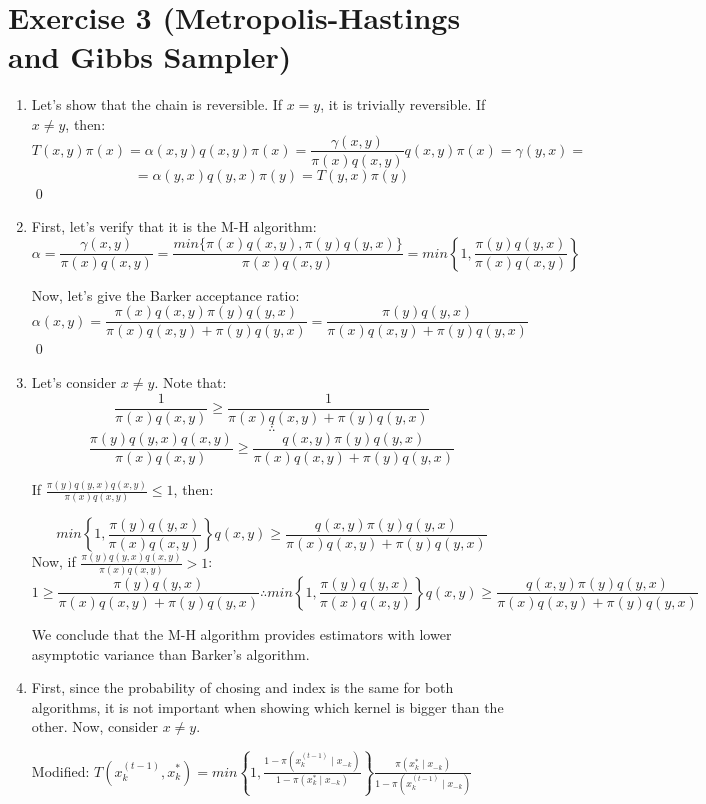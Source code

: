 \documentclass[12pt,letterpaper]{article}
\begin{document}
\section*{Exercise 3 (Metropolis-Hastings and Gibbs Sampler)}
\begin{enumerate}[leftmargin=!,labelindent=5pt]
\item  Let's show that the chain is reversible. If $x=y$, it is trivially
reversible. If $x \neq y$, then:
$$
T(x,y) \pi(x) = \alpha(x,y)q(x,y)\pi(x) =
\frac{\gamma(x,y)}{\pi(x)q(x,y)}q(x,y)\pi(x) = \gamma(y,x) =
$$
$$
= \alpha(y,x) q(y,x) \pi(y) = T(y,x) \pi(y)
$$
\qed

\item First, let's verify that it is the M-H algorithm:
$$
\alpha = \frac{\gamma(x,y)}{\pi(x)q(x,y)} = 
\frac{min \{  \pi(x) q(x,y), \pi(y) q(y,x) \}}
{\pi(x) q(x,y)} =
min \left \{
	1, \frac{\pi(y)q(y,x)}
	{\pi(x)q(x,y)}
\right\}
$$

Now, let's give the Barker acceptance ratio:
$$
\alpha(x,y) = \frac{\pi(x)q(x,y)\pi(y)q(y,x)}
{\pi(x)q(x,y)+\pi(y)q(y,x)} =
\frac{\pi(y)q(y,x)}{\pi(x)q(x,y) + \pi(y)q(y,x)}
$$
\qed

\item Let's consider $x \neq y$. Note that:
$$
\frac{1}{\pi(x)q(x,y)}
\geq
\frac{1}{\pi(x)q(x,y) + \pi(y)q(y,x)}
$$
$$
\therefore
$$
$$
\frac{\pi(y)q(y,x)q(x,y)}{\pi(x)q(x,y)}
\geq
\frac{q(x,y)\pi(y)q(y,x)}{\pi(x)q(x,y) + \pi(y)q(y,x)}
$$

If $\frac{\pi(y)q(y,x)q(x,y)}{\pi(x)q(x,y)} \leq 1$, then:

$$
min\left \{
1,
\frac{\pi(y)q(y,x)}{\pi(x)q(x,y)}
\right\}q(x,y)
\geq
\frac{q(x,y)\pi(y)q(y,x)}{\pi(x)q(x,y) + \pi(y)q(y,x)}
$$
Now, if 
$\frac{\pi(y)q(y,x)q(x,y)}{\pi(x)q(x,y)} > 1$:
$$ 
1
\geq
\frac{\pi(y)q(y,x)}{\pi(x)q(x,y) + \pi(y)q(y,x)} \therefore
min\left \{
1,
\frac{\pi(y)q(y,x)}{\pi(x)q(x,y)}
\right\}q(x,y)
\geq
\frac{q(x,y)\pi(y)q(y,x)}{\pi(x)q(x,y) + \pi(y)q(y,x)}
$$

We conclude that the M-H algorithm provides estimators with
lower asymptotic variance than Barker's algorithm.

\item First, since the probability of chosing and index is the same
for both algorithms, it is not important when showing which
kernel is bigger than the other. Now, consider $x \neq y$.

Modified: $T(x_k^{(t-1)}, x_k^*) =
min\left\{
1, \frac{1- \pi(x_k^{(t-1)} \mid x_{-k})}{1 -  \pi(x_k^* \mid x_{-k})}
\right\}
\frac{\pi(x_k^* \mid x_{-k})}{1- \pi(x_k^{(t-1)} \mid x_{-k})}$


\end{enumerate}
\end{document}
